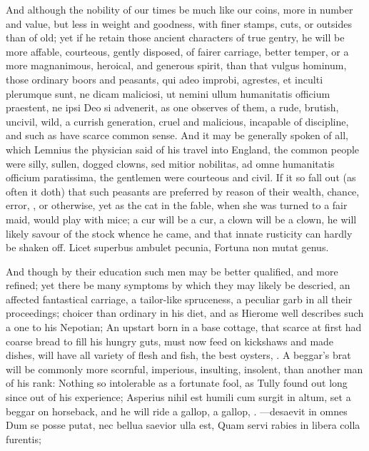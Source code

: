 {And although the nobility of our times be much like our coins, more in
number and value, but less in weight and goodness, with finer stamps,
cuts, or outsides than of old; yet if he retain those ancient
characters of true gentry, he will be more affable, courteous, gently
disposed, of fairer carriage, better temper, or a more magnanimous,
heroical, and generous spirit, than that vulgus hominum, those ordinary
boors and peasants, qui adeo improbi, agrestes, et inculti plerumque
sunt, ne dicam maliciosi, ut nemini ullum humanitatis officium
praestent, ne ipsi Deo si advenerit, as one observes of them, a
rude, brutish, uncivil, wild, a currish generation, cruel and
malicious, incapable of discipline, and such as have scarce common
sense. And it may be generally spoken of all, which  Lemnius the
physician said of his travel into England, the common people were
silly, sullen, dogged clowns, sed mitior nobilitas, ad omne humanitatis
officium paratissima, the gentlemen were courteous and civil. If it so
fall out (as often it doth) that such peasants are preferred by reason
of their wealth, chance, error, \etc{}, or otherwise, yet as the cat in
the fable, when she was turned to a fair maid, would play with mice; a
cur will be a cur, a clown will be a clown, he will likely savour of
the stock whence he came, and that innate rusticity can hardly be
shaken off.
Licet superbus ambulet pecunia,
Fortuna non mutat genus.

And though by their education such men may be better qualified, and
more refined; yet there be many symptoms by which they may likely be
descried, an affected fantastical carriage, a tailor-like spruceness, a
peculiar garb in all their proceedings; choicer than ordinary in his
diet, and as  Hierome well describes such a one to his Nepotian;
An upstart born in a base cottage, that scarce at first had coarse
bread to fill his hungry guts, must now feed on kickshaws and made
dishes, will have all variety of flesh and fish, the best oysters, \etc{}.
A beggar's brat will be commonly more scornful, imperious, insulting,
insolent, than another man of his rank: Nothing so intolerable as a
fortunate fool, as Tully found out long since out of his
experience; Asperius nihil est humili cum surgit in altum, set a beggar
on horseback, and he will ride a gallop, a gallop, \etc{}.
---desaevit in omnes
Dum se posse putat, nec bellua saevior ulla est,
Quam servi rabies in libera colla furentis;

}
